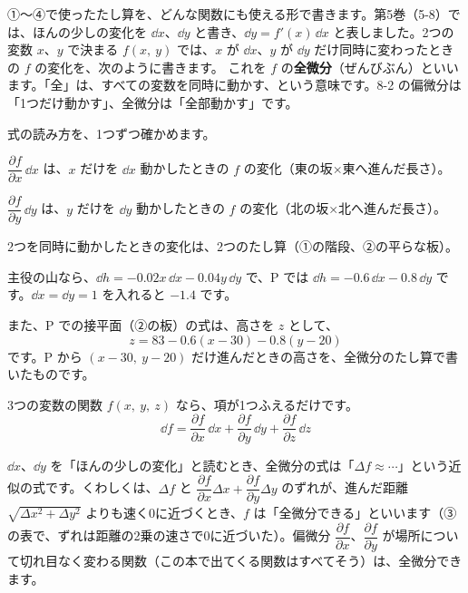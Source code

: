 


\leavevmode\label{bk:8-3:zenbibun}①〜④で使ったたし算を、どんな関数にも使える形で書きます。第5巻（5-8）では、ほんの少しの変化を $\dd x$、$\dd y$ と書き、$\dd y=f'(x)\,\dd x$ と表しました。2つの変数 $x$、$y$ で決まる $f(x,\ y)$ では、$x$ が $\dd x$、$y$ が $\dd y$ だけ同時に変わったときの $f$ の変化を、次のように書きます。
これを $f$ の\textbf{全微分}（ぜんびぶん）といいます。「全」は、すべての変数を同時に動かす、という意味です。8-2 の偏微分は「1つだけ動かす」、全微分は「全部動かす」です。

\noindent 式の読み方を、1つずつ確かめます。
\begin{enumerate}[label={\bkcircled[\bkTT]{\arabic*}}, leftmargin=2.4\zw, itemsep=2pt, topsep=2pt]
\item $\dfrac{\partial f}{\partial x}\,\dd x$ は、$x$ だけを $\dd x$ 動かしたときの $f$ の変化（東の坂×東へ進んだ長さ）。
\item $\dfrac{\partial f}{\partial y}\,\dd y$ は、$y$ だけを $\dd y$ 動かしたときの $f$ の変化（北の坂×北へ進んだ長さ）。
\item 2つを同時に動かしたときの変化は、2つのたし算（①の階段、②の平らな板）。
\end{enumerate}
主役の山なら、$\dd h=-0.02x\,\dd x-0.04y\,\dd y$ で、P では $\dd h=-0.6\,\dd x-0.8\,\dd y$ です。$\dd x=\dd y=1$ を入れると $-1.4$ です。

\noindent また、P での接平面（②の板）の式は、高さを $z$ として、
\[ z=83-0.6(x-30)-0.8(y-20) \]
です。P から $(x-30,\ y-20)$ だけ進んだときの高さを、全微分のたし算で書いたものです。

3つの変数の関数 $f(x,\ y,\ z)$ なら、項が1つふえるだけです。
\[ \dd f=\frac{\partial f}{\partial x}\,\dd x+\frac{\partial f}{\partial y}\,\dd y+\frac{\partial f}{\partial z}\,\dd z \]

\begin{seikaku}
$\dd x$、$\dd y$ を「ほんの少しの変化」と読むとき、全微分の式は「$\Delta f\approx\cdots$」という近似の式です。くわしくは、$\Delta f$ と $\dfrac{\partial f}{\partial x}\Delta x+\dfrac{\partial f}{\partial y}\Delta y$ のずれが、進んだ距離 $\sqrt{\Delta x^2+\Delta y^2}$ よりも速く0に近づくとき、$f$ は「全微分できる」といいます（③の表で、ずれは距離の2乗の速さで0に近づいた）。偏微分 $\dfrac{\partial f}{\partial x}$、$\dfrac{\partial f}{\partial y}$ が場所について切れ目なく変わる関数（この本で出てくる関数はすべてそう）は、全微分できます。
\end{seikaku}

